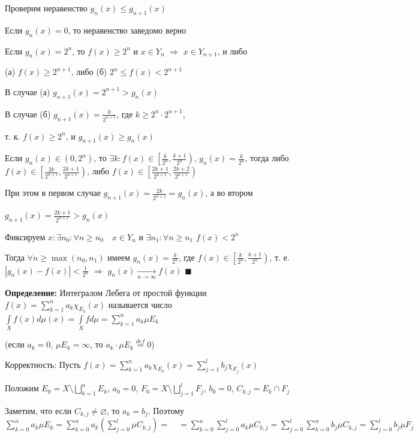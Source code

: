 \documentclass[a4paper]{report}
\begin{document}
Проверим неравенство $g_n(x)\le g_{n+1}(x)$

Если $g_n(x)=0$, то неравенство заведомо верно

Если $g_n(x)=2^n$, то $f(x)\ge2^n$ и $x\in Y_n$ $\Rightarrow$ $x\in Y_{n+1}$, и либо

(а) $f(x)\ge2^{n+1}$, либо (б) $2^n\le f(x)<2^{n+1}$

В случае (а) $g_{n+1}(x)=2^{n+1}>g_n(x)$

В случае (б) $g_{n+1}(x)=\displaystyle\frac{k}{2^{n+1}}$, где $k\ge2^n\cdot2^{n+1}$,

т. к. $f(x)\ge2^n$, и $g_{n+1}(x)\ge g_n(x)$

Если $g_n(x)\in(0,2^n)$, то $\exists k\colon f(x)\in\left[\displaystyle\frac{k}{2^n},\displaystyle\frac{k+1}{2^n}\right)$, $g_n(x)=\displaystyle\frac{k}{2^n}$, тогда либо $f(x)\in\left[\displaystyle\frac{2k}{2^{n+1}},\displaystyle\frac{2k+1}{2^{n+1}}\right)$, либо $f(x)\in\left[\displaystyle\frac{2k+1}{2^{n+1}},\displaystyle\frac{2k+2}{2^{n+1}}\right)$

При этом в первом случае $g_{n+1}(x)=\displaystyle\frac{2k}{2^{n+1}}=g_n(x)$, а во втором

$g_{n+1}(x)=\displaystyle\frac{2k+1}{2^{n+1}}>g_n(x)$

Фиксируем $x\colon\exists n_0\colon\forall n\ge n_0\quad x\in Y_n$ и $\exists n_1\colon\forall n\ge n_1$ $f(x)<2^n$

Тогда $\forall n\ge\max(n_0,n_1)$ имеем $g_n(x)=\displaystyle\frac{k}{2^n}$, где $f(x)\in\left[\displaystyle\frac{k}{2^n},\displaystyle\frac{k+1}{2^n}\right)$, т. е. $|g_n(x)-f(x)|<\displaystyle\frac{1}{2^n}$ $\Rightarrow$ $g_n
(x)\xrightarrow[n\to\infty]{}f(x)$ $\blacksquare$
\bigskip

\noindent\textbf{Определение:} Интегралом Лебега от простой функции $f(x)=\sum\limits_{k=1}^n a_k\chi_{E_k}(x)$ называется число $\displaystyle\int\limits_X f(x)d\mu(x)=\displaystyle\int\limits_X fd\mu=\sum\limits_{k=1}^n a_k\mu E_k$

(если $a_k=0$, $\mu E_k=\infty$, то $a_k\cdot\mu E_k\stackrel{def}{=}0$)

Корректность: Пусть $f(x)=\sum\limits_{k=1}^n a_k\chi_{E_k}(x)=\sum\limits_{j=1}^l b_j\chi_{F_j}(x)$

Положим $E_0=X\setminus\bigsqcup\limits_{k=1}^n E_k$, $a_0=0$, $F_0=X\setminus\bigsqcup\limits_{j=1}^l F_j$, $b_0=0$, $C_{k,j}=E_k\cap F_j$

Заметим, что если $C_{k,j}\ne\varnothing$, то $a_k=b_j$. Поэтому $\sum\limits_{k=0}^n a_k\mu E_k=\sum\limits_{k=0}^n a_k\left(\sum\limits_{j=0}^l\mu C_{k,j}\right)=
\quad=\sum\limits_{k=0}^n\sum\limits_{j=0}^l a_k\mu C_{k,j}=\sum\limits_{j=0}^l\sum\limits_{k=0}^n b_j\mu C_{k,j}=\sum\limits_{j=0}^l b_j\mu F_j$
\bigskip
\end{document}
